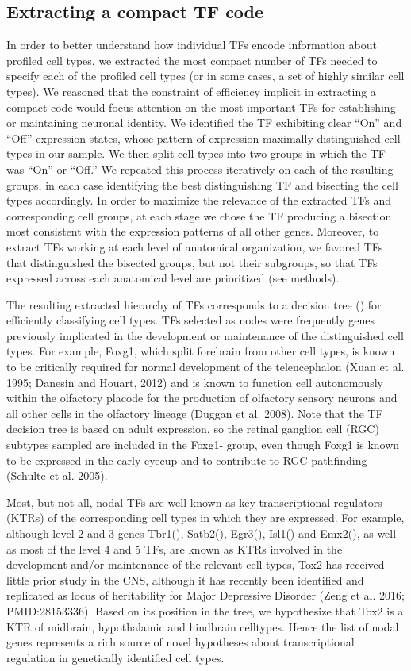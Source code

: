 \subsection{Extracting a compact TF code}
In order to better understand how individual TFs encode information about profiled cell types, we extracted the most compact number of TFs needed to specify each of the profiled cell types (or in some cases, a set of highly similar cell types). We reasoned that the constraint of efficiency implicit in extracting a compact code would focus attention on the most important TFs for establishing or maintaining neuronal identity. We identified the TF exhibiting clear “On” and “Off” expression states, whose pattern of expression maximally distinguished cell types in our sample. We then split cell types into two groups in which the TF was “On” or “Off.” We repeated this process iteratively on each of the resulting groups, in each case identifying the best distinguishing TF and bisecting the cell types accordingly. In order to maximize the relevance of the extracted TFs and corresponding cell groups, at each stage we chose the TF producing a bisection most consistent with the expression patterns of all other genes. Moreover, to extract TFs working at each level of anatomical organization, we favored TFs that distinguished the bisected groups, but not their subgroups, so that TFs expressed across each anatomical level are prioritized (see methods).

The resulting extracted hierarchy of TFs corresponds to a decision tree () for efficiently classifying cell types.
TFs selected as nodes were frequently genes previously implicated in the development or maintenance of the distinguished cell types. For example, Foxg1, which split forebrain from other cell types, is known to be critically required for normal development of the telencephalon (Xuan et al. 1995; Danesin and Houart, 2012) and is known to function cell autonomously within the olfactory placode for the production of olfactory sensory neurons and all other cells in the olfactory lineage (Duggan et al. 2008). Note that the TF decision tree is based on adult expression, so the retinal ganglion cell (RGC) subtypes sampled are included in the Foxg1- group, even though Foxg1 is known to be expressed in the early eyecup and to contribute to RGC pathfinding (Schulte et al. 2005).

Most, but not all, nodal TFs are well known as key transcriptional regulators (KTRs) of the corresponding cell types in which they are expressed. For example, although level 2 and 3 genes Tbr1(), Satb2(), Egr3(), Isl1() and Emx2(), as well as most of the level 4 and 5 TFs, are known as KTRs involved in the development and/or maintenance of the relevant cell types, Tox2 has received little prior study in the CNS, although it has recently been identified and replicated as locus of heritability for Major Depressive Disorder (Zeng et al. 2016; PMID:28153336). Based on its position in the tree, we hypothesize that Tox2 is a KTR of midbrain, hypothalamic and hindbrain celltypes. Hence the list of nodal genes represents a rich source of novel hypotheses about transcriptional regulation in genetically identified cell types.

